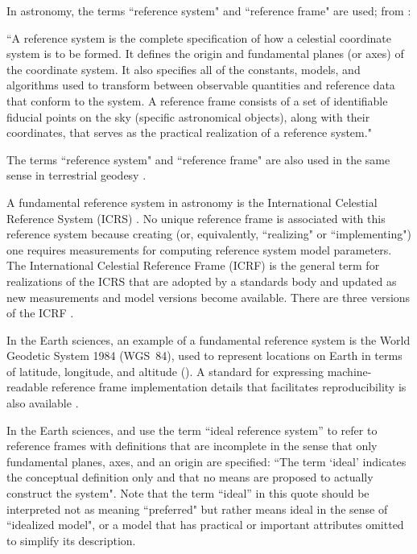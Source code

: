 \documentclass[draft]{agujournal2019}
\begin{document}

In astronomy, the terms ``reference system" and ``reference frame" are used; from :

``A reference system is the complete specification of how a celestial coordinate system is to be formed. It defines the origin and fundamental planes (or axes) of the coordinate system. It also specifies all of the constants, models, and algorithms used to transform between observable quantities and reference data that conform to the system. A reference frame consists of a set of identifiable fiducial points on the sky (specific astronomical objects), along with their coordinates, that serves as the practical realization of a reference system."

The terms ``reference system" and ``reference frame" are also used in the same sense in terrestrial geodesy \cite{Seitz2014}.

A fundamental reference system in astronomy is the International Celestial Reference System (ICRS) \cite{Petit2010}. No unique reference frame is associated with this reference system because creating (or, equivalently, ``realizing" or ``implementing") one requires measurements for computing reference system model parameters. The International Celestial Reference Frame (ICRF) is the general term for realizations of the ICRS that are adopted by a standards body and updated as new measurements and model versions become available. There are three versions of the ICRF \cite{Charlot2020}. 

In the Earth sciences, an example of a fundamental reference system is the World Geodetic System 1984 (WGS~84), used to represent locations on Earth in terms of latitude, longitude, and altitude (). A standard for expressing machine-readable reference frame implementation details that facilitates reproducibility is also available \cite{OGC2023}.

In the Earth sciences,  and  use the term ``ideal reference system'' to refer to reference frames with definitions that are incomplete in the sense that only fundamental planes, axes, and an origin are specified: ``The term `ideal' indicates the conceptual definition only and that no means are proposed to actually construct the system". Note that the term ``ideal'' in this quote should be interpreted not as meaning ``preferred" but rather means ideal in the sense of ``idealized model", or a model that has practical or important attributes omitted to simplify its description.
\end{document}

